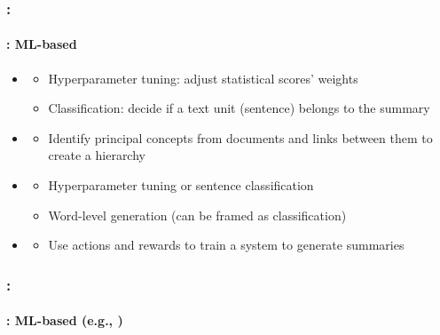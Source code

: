 \documentclass[xcolor=table]{beamer}
\begin{document}
\begin{frame}
	\frametitle{\insertshortsubtitle: \insertsection}
	\framesubtitle{\insertsubsection: ML-based}
	
	\begin{itemize}
		\item {}
		\begin{itemize}
			\item Hyperparameter tuning: adjust statistical scores' weights
			\item Classification: decide if a text unit (sentence) belongs to the summary
		\end{itemize}
		
		\item {}
		\begin{itemize}
			\item Identify principal concepts from documents and links between them to create a hierarchy
		\end{itemize}
		
		\item {}
		\begin{itemize}
			\item Hyperparameter tuning or sentence classification
			\item Word-level generation (can be framed as classification)
		\end{itemize}
		
		\item {}
		\begin{itemize}
			\item Use actions and rewards to train a system to generate summaries
		\end{itemize}
	\end{itemize}
	
\end{frame}

\begin{frame}
	\frametitle{\insertshortsubtitle: \insertsection}
	\framesubtitle{\insertsubsection: ML-based (e.g., \cite{2020-aries})}
	
	\begin{center}
	\end{center}
	
\end{frame}
\end{document}
